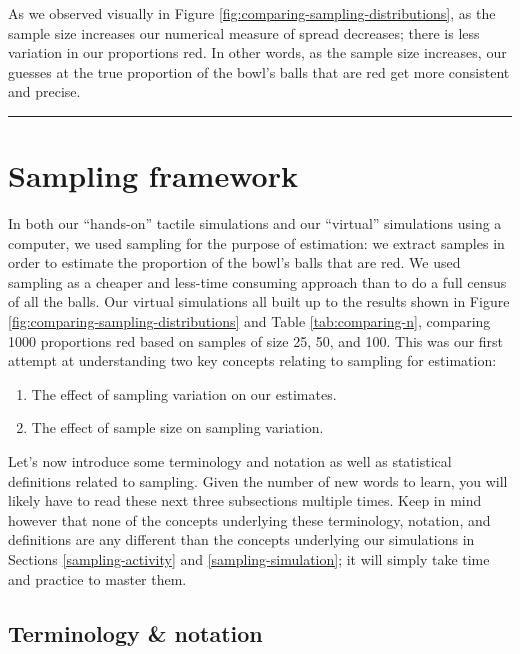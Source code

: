 \documentclass[12pt, krantz2,]{krantz}
\providecommand{\tightlist}{%
  \setlength{\itemsep}{0pt}\setlength{\parskip}{0pt}}
\begin{document}
As we observed visually in Figure \ref{fig:comparing-sampling-distributions}, as the sample size increases our numerical measure of spread decreases; there is less variation in our proportions red. In other words, as the sample size increases, our guesses at the true proportion of the bowl's balls that are red get more consistent and precise.

\begin{center}\rule{0.5\linewidth}{\linethickness}\end{center}

\hypertarget{sampling-framework}{%
\section{Sampling framework}\label{sampling-framework}}

In both our ``hands-on'' tactile simulations and our ``virtual'' simulations using a computer, we used sampling for the purpose of estimation: we extract samples in order to estimate the proportion of the bowl's balls that are red. We used sampling as a cheaper and less-time consuming approach than to do a full census of all the balls. Our virtual simulations all built up to the results shown in Figure \ref{fig:comparing-sampling-distributions} and Table \ref{tab:comparing-n}, comparing 1000 proportions red based on samples of size 25, 50, and 100. This was our first attempt at understanding two key concepts relating to sampling for estimation:

\begin{enumerate}
\def\labelenumi{\arabic{enumi}.}
\tightlist
\item
  The effect of sampling variation on our estimates.
\item
  The effect of sample size on sampling variation.
\end{enumerate}

Let's now introduce some terminology and notation as well as statistical definitions related to sampling. Given the number of new words to learn, you will likely have to read these next three subsections multiple times. Keep in mind however that none of the concepts underlying these terminology, notation, and definitions are any different than the concepts underlying our simulations in Sections \ref{sampling-activity} and \ref{sampling-simulation}; it will simply take time and practice to master them.

\hypertarget{terminology-notation}{%
\subsection{Terminology \& notation}\label{terminology-notation}}
\end{document}
